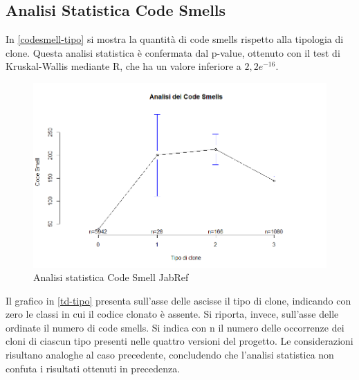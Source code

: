 \subsection{Analisi Statistica Code Smells}
In \autoref{codesmell-tipo} si mostra la quantità di code smells rispetto alla tipologia di clone. Questa analisi statistica è confermata dal p-value, ottenuto con il test di Kruskal-Wallis mediante R, che ha un valore inferiore a $2,2 e^{-16}$.
\begin{figure}[htbp]
	\centering
	\includegraphics[scale=0.5]{analisi_R/AnalisiJabref/2-gplot-codesmell-type.png}
\caption{Analisi statistica Code Smell JabRef}
\label{codesmell-tipo}
\end{figure}

Il grafico in \autoref{td-tipo} presenta sull'asse delle ascisse il tipo di clone, indicando con zero le classi in cui il codice clonato è assente. Si riporta, invece, sull'asse delle ordinate il numero di code smells. Si indica con n il numero delle occorrenze dei cloni di ciascun tipo presenti nelle quattro versioni del progetto. Le considerazioni risultano analoghe al caso precedente, concludendo che l'analisi statistica non confuta i risultati ottenuti in precedenza.

